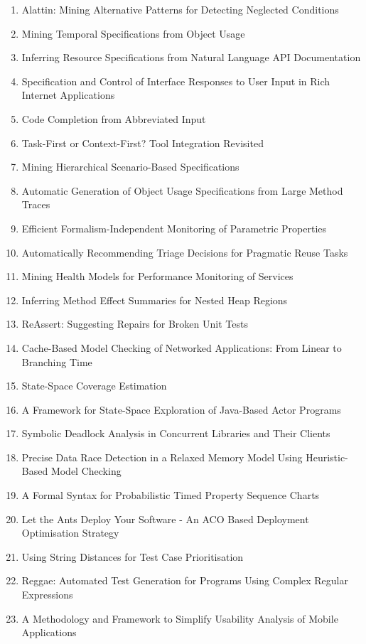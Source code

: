 \begin{enumerate}[itemsep=-1ex]
  \item Alattin: Mining Alternative Patterns for Detecting Neglected Conditions
  \item Mining Temporal Specifications from Object Usage
  \item Inferring Resource Specifications from Natural Language API Documentation
  \item Specification and Control of Interface Responses to User Input in Rich Internet Applications
  \item Code Completion from Abbreviated Input
  \item Task-First or Context-First? Tool Integration Revisited
  \item Mining Hierarchical Scenario-Based Specifications
  \item Automatic Generation of Object Usage Specifications from Large Method Traces
  \item Efficient Formalism-Independent Monitoring of Parametric Properties
  \item Automatically Recommending Triage Decisions for Pragmatic Reuse Tasks
  \item Mining Health Models for Performance Monitoring of Services
  \item Inferring Method Effect Summaries for Nested Heap Regions
  \item ReAssert: Suggesting Repairs for Broken Unit Tests
  \item Cache-Based Model Checking of Networked Applications: From Linear to Branching Time
  \item State-Space Coverage Estimation
  \item A Framework for State-Space Exploration of Java-Based Actor Programs
  \item Symbolic Deadlock Analysis in Concurrent Libraries and Their Clients
  \item Precise Data Race Detection in a Relaxed Memory Model Using Heuristic-Based Model Checking
  \item A Formal Syntax for Probabilistic Timed Property Sequence Charts
  \item Let the Ants Deploy Your Software - An ACO Based Deployment Optimisation Strategy
  \item Using String Distances for Test Case Prioritisation
  \item Reggae: Automated Test Generation for Programs Using Complex Regular Expressions
  \item A Methodology and Framework to Simplify Usability Analysis of Mobile Applications

\end{enumerate}
